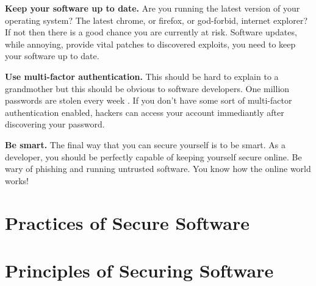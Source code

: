 \documentclass{csse4400}
\begin{document}
\textbf{Keep your software up to date.}
Are you running the latest version of your operating system?
The latest chrome, or firefox, or god-forbid, internet explorer?
If not then there is a good chance you are currently at risk.
Software updates, while annoying, provide vital patches to discovered exploits,
you need to keep your software up to date.

\textbf{Use multi-factor authentication.}
This should be hard to explain to a grandmother but this should be obvious to software developers.
One million passwords are stolen every week \cite{password-security}.
If you don't have some sort of multi-factor authentication enabled, hackers can access your account immediantly after discovering your password.

\textbf{Be smart.}
The final way that you can secure yourself is to be smart.
As a developer, you should be perfectly capable of keeping yourself secure online.
Be wary of phishing and running untrusted software.
You know how the online world works!


\section{Practices of Secure Software}


\section{Principles of Securing Software}
\end{document}
